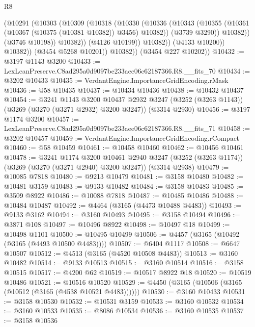 \begin{lexlean}{R8}
\begin{coremodule}
                      (@10291
                        (@10303
                          (@10309
                            (@10318
                              (@10330
                                (@10336
                                  (@10343
                                    (@10355 (@10361 (@10367 (@10375 (@10381 @10382)) @3456) @10382))
                                    (@3739 @3290))
                                  @10382))
                              (@3746 @10198))
                            @10382))
                        (@4126 @10199))
                      @10382))
                  (@4133 @10200))
                @10382))
            (@3454 @5268 @10201))
          @10382))
      (@3454 @227 @10202))
@10432 := @3197 @1143 @3200
@10433 := LexLeanPreserve.C8ad295a0d9097be233aee06c62187366.R8.__fits_70
@10434 := @3202 @10433
@10435 := VerdantEngine.ImportanceGridEncoding.rMask
@10436 := @58 @10435
@10437 := @10434 @10436
@10438 := @10432 @10437
@10454 := @3241
    @1143
    @3200
    @10437
    @2932
    @3247
    (@3252 (@3263 @1143))
    (@3269 (@3270 (@3271 @2932) @3200 @3247))
    (@3314 @2930)
@10456 := @3197 @1174 @3200
@10457 := LexLeanPreserve.C8ad295a0d9097be233aee06c62187366.R8.__fits_71
@10458 := @3202 @10457
@10459 := VerdantEngine.ImportanceGridEncoding.rCompact
@10460 := @58 @10459
@10461 := @10458 @10460
@10462 := @10456 @10461
@10478 := @3241
    @1174
    @3200
    @10461
    @2940
    @3247
    (@3252 (@3263 @1174))
    (@3269 (@3270 (@3271 @2940) @3200 @3247))
    (@3314 @2938)
@10479 := @10085 @7818
@10480 := @9213 @10479
@10481 := @3158 @10480
@10482 := @10481 @3159
@10483 := @9133 @10482
@10484 := @3158 @10483
@10485 := @3509 @8922
@10486 := @10088 @7818
@10487 := @10485 @10486
@10488 := @10484 @10487
@10492 := @4464 (@3165 (@4473 @10488 @4483))
@10493 := @9133 @3162
@10494 := @3160 @10493
@10495 := @3158 @10494
@10496 := @3871 @108
@10497 := @10496 @8922
@10498 := @10497 @18
@10499 := @10498 @1101
@10500 := @10495 @10499
@10506 := @4457 (@3165 (@10492 (@3165 (@4493 @10500 @4483))))
@10507 := @6404 @1117
@10508 := @6647 @10507
@10512 := @4513 (@3165 (@4520 @10508 @4483))
@10513 := @3160 @10482
@10514 := @9133 @10513
@10515 := @3160 @10514
@10516 := @3158 @10515
@10517 := @4200 @62
@10519 := @10517 @8922 @18
@10520 := @10519 @10486
@10521 := @10516 @10520
@10529 := @4450 (@3165 (@10506 (@3165 (@10512 (@3165 (@4538 @10521 @4483))))))
@10530 := @3160 @10433
@10531 := @3158 @10530
@10532 := @10531 @3159
@10533 := @3160 @10532
@10534 := @3160 @10533
@10535 := @8086 @10534
@10536 := @3160 @10535
@10537 := @3158 @10536

\end{coremodule}
\end{lexlean}
